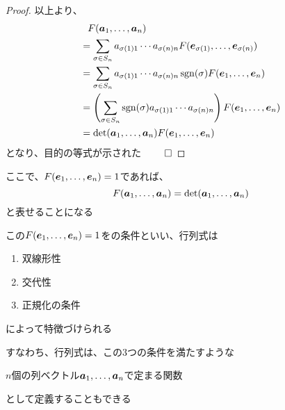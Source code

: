 \documentclass[../../../topic_linear-algebra]{subfiles}
\begin{document}
\begin{proof}
  \br

  以上より、
  \begin{align*}
     & \phantom{=} F(\vb*{a}_1, \ldots, \vb*{a}_n)                                                                                \\
     & = \sum_{\sigma \in S_n} a_{\sigma(1) 1} \cdots a_{\sigma(n) n} F(\vb*{e}_{\sigma(1)}, \ldots, \vb*{e}_{\sigma(n)})         \\
     & = \sum_{\sigma \in S_n} a_{\sigma(1) 1} \cdots a_{\sigma(n) n} \operatorname{sgn}(\sigma) F(\vb*{e}_1, \ldots, \vb*{e}_n)                \\
     & = \left( \sum_{\sigma \in S_n} \operatorname{sgn}(\sigma) a_{\sigma(1) 1} \cdots a_{\sigma(n) n} \right) F(\vb*{e}_1, \ldots, \vb*{e}_n) \\
     & = \det(\vb*{a}_1, \ldots, \vb*{a}_n) F(\vb*{e}_1, \ldots, \vb*{e}_n)
  \end{align*}
  となり、目的の等式が示された $\qed$
\end{proof}

ここで、$F(\vb*{e}_1, \ldots, \vb*{e}_n) = 1$であれば、
\begin{equation*}
  F(\vb*{a}_1, \ldots, \vb*{a}_n) = \det(\vb*{a}_1, \ldots, \vb*{a}_n)
\end{equation*}
と表せることになる

\br

この$F(\vb*{e}_1, \ldots, \vb*{e}_n) = 1$をの条件といい、行列式は
\begin{enumerate}[label=\romanlabel]
  \item 双線形性
  \item 交代性
  \item 正規化の条件
\end{enumerate}
によって特徴づけられる

\br

すなわち、行列式は、この3つの条件を満たすような
\begin{shaded}
  $n$個の列ベクトル$\vb*{a}_1, \ldots, \vb*{a}_n$で定まる関数
\end{shaded}
として定義することもできる
\end{document}
